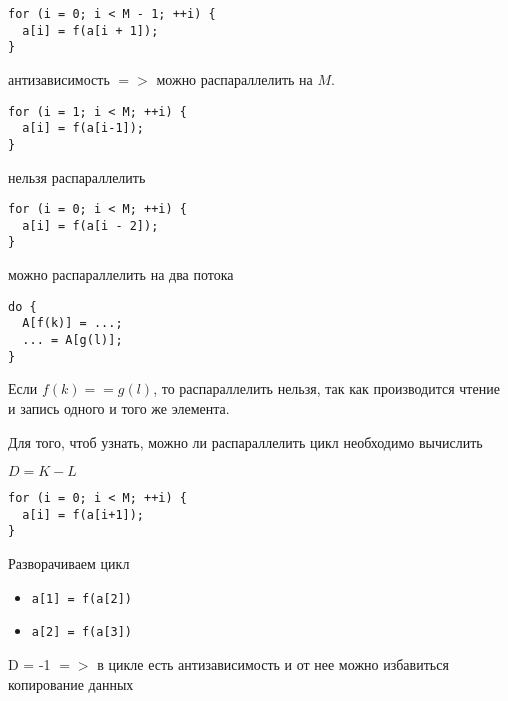 \begin{frame}[fragile]

\begin{lstlisting}
for (i = 0; i < M - 1; ++i) {
  a[i] = f(a[i + 1]);
}
\end{lstlisting}

антизависимость $=>$ можно распараллелить на $M$.

\end{frame}

\begin{frame}[fragile]

\begin{lstlisting}
for (i = 1; i < M; ++i) {
  a[i] = f(a[i-1]);
}
\end{lstlisting}

нельзя распараллелить

\end{frame}

\begin{frame}[fragile]

\begin{lstlisting}
for (i = 0; i < M; ++i) {
  a[i] = f(a[i - 2]);
}
\end{lstlisting}

можно распараллелить на два потока

\end{frame}

\begin{frame}[fragile]

\begin{lstlisting}
do {
  A[f(k)] = ...;
  ... = A[g(l)];
}
\end{lstlisting}

Если $f(k) == g(l)$, то распараллелить нельзя, так как производится чтение и запись одного и того же элемента.

\end{frame}

\begin{frame}[fragile]

Для того, чтоб узнать, можно ли распараллелить цикл необходимо вычислить

$D = K - L$

\begin{lstlisting}
for (i = 0; i < M; ++i) {
  a[i] = f(a[i+1]);
}
\end{lstlisting}

Разворачиваем цикл

\begin{itemize}
  \item \texttt{a[1] = f(a[2])}
  \item \texttt{a[2] = f(a[3])}
\end{itemize}

D = -1 $=>$ в цикле есть антизависимость и от нее можно избавиться копирование данных

\end{frame}

